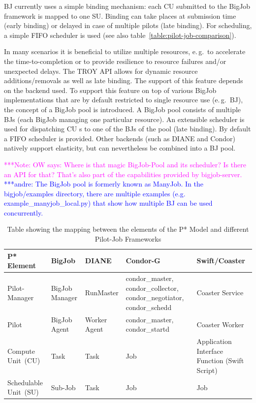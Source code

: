 \documentclass[conference,final]{IEEEtran}
\newcommand{\alnote}[1]{ {\textcolor{blue} { ***andre: #1 }}}
\newcommand{\note}[1]{ {\textcolor{magenta} { ***Note: #1 }}}
\newcommand{\alnote}[1]{}
\newcommand{\note}[1]{}
\newcommand{\pilot}{Pilot\xspace}
\newcommand{\computeunit}{Compute Unit\xspace}
\newcommand{\cu}{CU\xspace}
\newcommand{\su}{Schedulable Unit\xspace}
\newcommand{\upp}{\vspace*{-0.5em}}
\begin{document}
BJ currently uses a simple binding mechanism: each \cu  submitted to the BigJob
framework is mapped to one SU. Binding can take places at submission
time (early binding) or delayed in case of multiple pilots (late binding). 
For scheduling, a simple FIFO scheduler is used (see also
table~\ref{table:pilot-job-comparison}).




In many scenarios it is beneficial to utilize multiple resources, e.\,g.\ to
accelerate the time-to-completion or to provide resilience to resource failures
and/or unexpected delays. The TROY API allows for dynamic resource
additions/removals as well as late binding. The support of this feature depends
on the backend used. To support this feature on top of various BigJob
implementations that are by default restricted to single resource use (e.\,g.\
BJ), the concept of a BigJob pool is introduced. A BigJob pool consists of
multiple BJs (each BigJob managing one particular resource). An extensible
scheduler is used for dispatching \cu s to one of the BJs of the pool (late
binding). By default a FIFO scheduler is provided. Other backends (such as DIANE
and Condor) natively support elasticity, but can nevertheless be combined into a
BJ pool.

\note{OW says: Where is that magic BigJob-Pool and its scheduler? Is there an
API for that? That's also part of the capabilities provided by
bigjob-server.}\alnote{The BigJob pool is formerly known as ManyJob. In the
bigjob/examples directory, there are multiple examples (e.g.
example\_manyjob\_local.py) that show how multiple BJ can be used concurrently.}

% 
\upp

\begin{table}[t]
\centering
\begin{tabular}{|p{2.5cm}|p{3cm}|p{3cm}|p{3cm}|p{3cm}|}
  \hline
  \textbf{P* Element} &\textbf{BigJob} &\textbf{DIANE} &\textbf{Condor-G} &\textbf{Swift/Coaster}  \\
  \hline
  Pilot-Manager &BigJob Manager & RunMaster & condor\_master, condor\_collector, condor\_negotiator, condor\_schedd &Coaster Service\\ 
  \hline
  \pilot &BigJob Agent  & Worker Agent &condor\_master, condor\_startd &Coaster Worker\\
  \hline
  \computeunit  \ (CU) &Task &Task &Job &Application Interface Function (Swift Script)\\
  \hline
  \su \ (SU) &Sub-Job &Task &Job &Job\\
\hline
\end{tabular}
\caption{Table showing the mapping between the elements of the P* Model and different Pilot-Job Frameworks\upp\upp} \label{table:bigjob-saga-diane}
\end{table}
\end{document}
